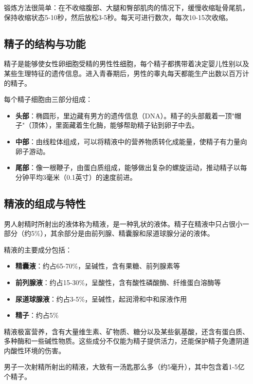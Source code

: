 \documentclass[12pt,a4paper,twoside]{ctexbook}
\begin{document}
锻炼方法很简单：在不收缩腹部、大腿和臀部肌肉的情况下，缓慢收缩耻骨尾肌，保持收缩状态5-10秒，然后放松3-5秒。每天可进行数次，每次10-15次收缩。

\subsection{精子的结构与功能}

精子是能够使女性卵细胞受精的男性性细胞，每个精子都携带着决定婴儿性别以及某些生理特征的遗传信息。进入青春期后，男性的睾丸每天都能生产出数以百万计的精子。

每个精子细胞由三部分组成：

\begin{itemize}
    \item \textbf{头部}：椭圆形，里边藏有男方的遗传信息（DNA）。精子的头部戴着一顶"帽子"（顶体），里面藏着生化酶，能够帮助精子钻到卵子中去。
    \item \textbf{中部}：由线粒体组成，可以将精液中的营养物质转化成能量，使精子有力量向卵子游动。
    \item \textbf{尾部}：像一根鞭子，由蛋白质组成，能够做出复杂的螺旋运动，推动精子以每分钟平均3毫米（0.1英寸）的速度前进。
\end{itemize}

\subsection{精液的组成与特性}

男人射精时所射出的液体称为精液，是一种乳状的液体。精子在精液中只占很小一部分（约5\%），其余部分是由前列腺、精囊腺和尿道球腺分泌的液体。

精液的主要成分包括：
\begin{itemize}
    \item \textbf{精囊液}：约占65-70\%，呈碱性，含有果糖、前列腺素等
    \item \textbf{前列腺液}：约占15-30\%，呈酸性，含有酸性磷酸酶、纤维蛋白溶酶等
    \item \textbf{尿道球腺液}：约占3-5\%，呈碱性，起润滑和中和尿液作用
    \item \textbf{精子}：约占5\%
\end{itemize}

精液极富营养，含有大量维生素、矿物质、糖分以及某些氨基酸，还含有蛋白质、多种酶和一些碱性物质。这些成分不仅能为精子提供活力，还能保护精子免遭阴道内酸性环境的伤害。

男子一次射精所射出的精液，大致有一汤匙那么多（约5毫升），其中包含着1-5亿个精子。
\end{document}
